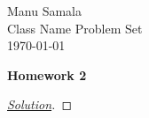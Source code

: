\documentclass[12pt,oneside,geqno]{article}
\newcommand\Name{Manu Samala}
\newcommand\Class{Class Name}
\newcommand\PSet{Problem Set}
\newcommand\Date{\today} %
\begin{document}
\begin{flushleft}
	\Name\\
	\Class\hspace{60pt}	\PSet\\
	\Date\\
\end{flushleft}

\begin{center}
{\bf Homework 2}
\end{center}

\begin{Question}[1] 
\end{Question}
\begin{proof}[\underline{Solution}]
	\hfill \break
\end{proof}
\end{document}
